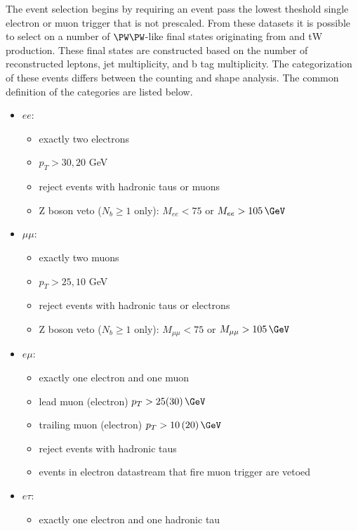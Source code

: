 The event selection begins by requiring an event pass the lowest \pt theshold single electron or muon trigger that is not prescaled. From these datasets it is possible to select on a number of $\PW\PW$-like final states originating from \ttbar and tW production.  These final states are constructed based on the number of reconstructed leptons, jet multiplicity, and b tag multiplicity.  The categorization of these events differs between the counting and shape analysis.  The common definition of the categories are listed below.


\begin{itemize}
    \singlespacing
    \item $ee$:
    \begin{itemize}
        \item exactly two electrons
        \item $p_{T} > 30, 20$ GeV
        \item reject events with hadronic taus or muons
        \item Z boson veto ($N_{b} \geq 1$ only): $M_{ee} < 75$ or $M_{ee} > 105\,\GeV$
    \end{itemize}
    \item $\mu\mu$:
    \begin{itemize}
        \item exactly two muons
        \item $p_{T} > 25, 10$ GeV
        \item reject events with hadronic taus or electrons
        \item Z boson veto ($N_{b} \geq 1$ only): $M_{\mu\mu} < 75$ or $M_{\mu\mu} > 105\,\GeV$
    \end{itemize}
    \item $e\mu$:
    \begin{itemize}
        \item exactly one electron and one muon
        \item lead muon (electron) $p_{T} > 25 (30)\,\GeV$
        \item trailing muon (electron) $p_{T} > 10\,(20)\,\GeV$
        \item reject events with hadronic taus 
        \item events in electron datastream that fire muon trigger are vetoed
    \end{itemize}
    \item $e\tau$:
    \begin{itemize}
        \item exactly one electron and one hadronic tau

\end{itemize}
\end{itemize}
